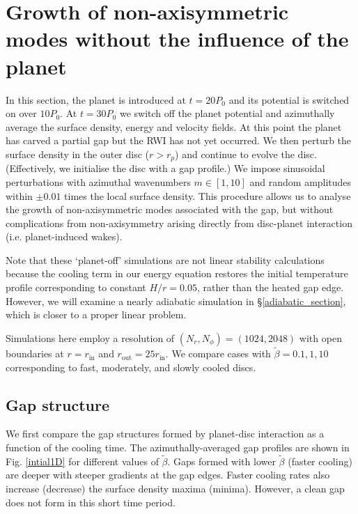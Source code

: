 \section{Growth of non-axisymmetric modes without the influence of the
  planet}\label{linear1} 
In this section, the planet is introduced at $t=20P_0$ and 
its potential is switched on over $10P_0$. At $t=30P_0$ we switch off the
planet potential and azimuthally average the surface density, energy
and velocity fields. At this point the planet has carved a partial
gap but the RWI has not yet occurred. 
We then perturb the surface density in the outer disc ($r>r_p$) and continue to 
evolve the disc. (Effectively, we initialise the
disc with a gap profile.) We impose  sinusoidal perturbations with 
azimuthal wavenumbers $m\in[1,10]$ and random amplitudes within $\pm 0.01$
times the local surface density. 
This procedure allows us to analyse the growth of 
non-axisymmetric modes associated with the gap, but without
complications from non-axisymmetry arising directly from disc-planet
interaction (i.e. planet-induced wakes). 

Note that these `planet-off' simulations are not linear stability
calculations because the cooling term in our energy equation
restores the initial temperature profile corresponding to constant
$H/r=0.05$, rather than the heated gap edge. However, we will 
examine a nearly adiabatic simulation in \S\ref{adiabatic_section},
which is closer to a proper linear problem. 

Simulations here employ a resolution of $(N_r,N_{\phi})=(1024,2048)$
with open boundaries at $r=r_\mathrm{in}$ and
$r_\mathrm{out}=25r_\mathrm{in}$. We compare cases with
$\tilde{\beta}=0.1,1,10$ corresponding to fast, moderately, 
and slowly cooled discs. 

\subsection{Gap structure}
We first compare the gap structures formed by planet-disc
interaction as a function of the cooling time. The azimuthally-averaged 
gap profiles are shown in Fig. \ref{intial1D} for different values of 
$\tilde\beta$. Gaps formed with lower $\tilde\beta$ (faster cooling) 
are deeper with steeper gradients at the gap edges. Faster cooling rates also 
increase (decrease) the surface density maxima (minima). However, a
clean gap does not form in this short time period.%

